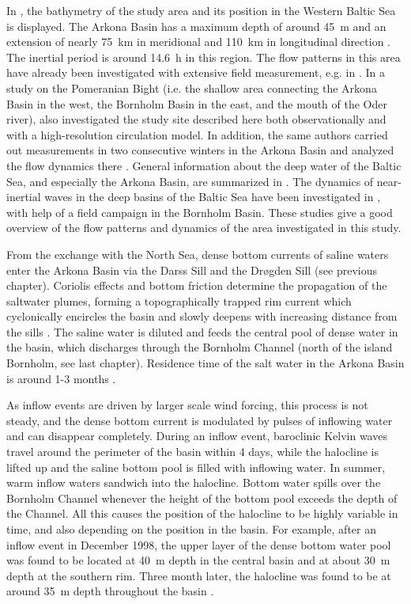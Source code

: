 In , the bathymetry of the study area and its position in the 
Western Baltic Sea is displayed. The Arkona Basin has a maximum depth of 
around 45~m and an extension of nearly 75~km in meridional and 110~km in 
longitudinal direction \citep[][]{lass2005}. The inertial 
period is around 14.6~h in this region. \FloatBarrier The flow patterns in 
this area 
have already been investigated with extensive field measurement, e.g. in 
\cite{lass1993}. In a study on the Pomeranian Bight (i.e. the shallow area 
connecting the Arkona Basin in the west, the Bornholm Basin in the east, and 
the mouth of the Oder river), \cite{lass2001} also investigated 
the study site described here both observationally and with a high-resolution 
circulation model. In addition, the same authors carried out measurements in 
two consecutive winters in the Arkona Basin and analyzed the flow dynamics 
there \citep[][]{lass2003,lass2005}. General information about the deep water 
of the Baltic Sea, and especially the Arkona Basin, are summarized in 
\cite{meier2006}. The dynamics of near-inertial waves in the deep basins 
of the Baltic Sea have been investigated in \cite{vanderlee2011}, with help of 
a field campaign in the Bornholm Basin. These studies give a good overview of 
the flow patterns and dynamics of the area investigated in this study.

From the exchange with the North Sea, dense bottom currents of saline waters 
enter the Arkona Basin via the Darss Sill and the Dr{\o}gden Sill (see 
previous chapter). Coriolis effects and bottom friction determine the 
propagation of the saltwater plumes, forming a topographically trapped rim 
current which cyclonically encircles the basin and slowly deepens with 
increasing distance from the sills \citep{lass2005}. The saline water is 
diluted and feeds the central pool of dense water in the basin, which 
discharges through the Bornholm Channel (north of the island Bornholm, see last 
chapter). Residence time of the salt water in the Arkona Basin is around 1-3 
months \citep[][]{lass2005, meier2006}.

As inflow events are driven by larger scale wind forcing, this process is not 
steady, and the dense bottom current is modulated by pulses of inflowing 
water and can disappear completely. During an inflow event, baroclinic Kelvin 
waves travel around the perimeter of the basin within 4 days, while the 
halocline is lifted up 
and the saline bottom pool is filled with inflowing water. In summer, warm 
inflow waters sandwich into the halocline. Bottom 
water spills over the Bornholm Channel whenever the height of the bottom pool 
exceeds the depth of the Channel. All this causes the position of the halocline 
to be highly variable in time, and also depending on the position in the basin. 
For example, after an inflow event in December 1998, the upper layer of 
the dense bottom water pool was found to be located at 40~m depth in the central 
basin and at about 30~m depth at the southern rim. Three month later, the 
halocline was found to be at around 35~m depth throughout the basin 
\citep[][]{lass2005}.

